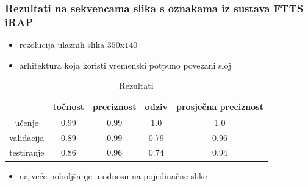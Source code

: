 \documentclass{beamer}
\begin{document}
\begin{frame}
 \frametitle{Rezultati na sekvencama slika s oznakama iz sustava FTTS iRAP}
 \begin{itemize}
  \item rezolucija ulaznih slika $350$x$140$
  \item arhitektura koja koristi vremenski potpuno povezani sloj
 \end{itemize}
 
\begin{table}[H]
\centering
\caption{Rezultati}
\label{score:temporal}
\begin{tabular}{c|c|c|c|c|}
\cline{2-5}
                                            & točnost & preciznost & odziv & prosječna preciznost \\ \hline
\multicolumn{1}{|c|}{učenje}     & 0.99       & 0.99        & 1.0     &           1.0           \\ \hline
\multicolumn{1}{|c|}{validacija} & 0.89       & 0.99        & 0.79     &            0.96          \\ \hline
\multicolumn{1}{|c|}{testiranje} & 0.86       & 0.96        & 0.74     &            0.94          \\ \hline
\end{tabular}
\end{table}

\begin{itemize}
 \item najveće poboljšanje u odnosu na pojedinačne slike
\end{itemize}


\end{frame}
\end{document}

